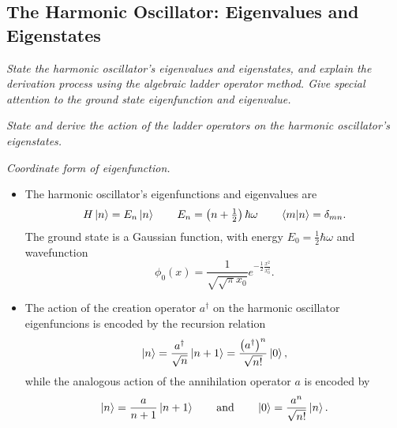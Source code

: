 \documentclass[11pt, a4paper]{article}
\newcommand{\eqtext}[1]{\qquad \text{#1} \qquad}
\begin{document}
\subsection{The Harmonic Oscillator: Eigenvalues and Eigenstates} \label{ss:qho-ladder}
\textit{State the harmonic oscillator's eigenvalues and eigenstates, and explain the derivation process using the algebraic ladder operator method. Give special attention to the ground state eigenfunction and eigenvalue.}

\vspace{2mm}
\textit{State and derive the action of the ladder operators on the harmonic oscillator's eigenstates.}

\vspace{2mm}
\textit{Coordinate form of eigenfunction.}

\begin{itemize}
    \item The harmonic oscillator's eigenfunctions and eigenvalues are
    \begin{equation*}
 		H\ket{n} = E_{n}\ket{n} \qquad E_{n} = \left(n + \tfrac{1}{2}\right)\hbar \omega \qquad \braket{m}{n} = \delta_{mn}.
    \end{equation*}
    The ground state is a Gaussian function, with energy $ E_{0} = \frac{1}{2}\hbar \omega $ and wavefunction
    \begin{equation*}
		\phi_{0}(x) = \frac{1}{\sqrt{\sqrt{\pi}x_{0}}}e^{-\frac{1}{2}\frac{x^{2}}{x_{0}^{2}}}.
    \end{equation*}

    \item The action of the creation operator $ a^{\dagger} $ on the harmonic oscillator eigenfuncions is encoded by the recursion relation
    \begin{equation*}
		\ket{n} = \frac{a^{\dagger}}{\sqrt{n}}\ket{n+1} = \frac{\big(a^{\dagger}\big)^{n}}{\sqrt{n!}}\ket{0},
    \end{equation*}
    while the analogous action of the annihilation operator $ a $ is encoded by
    \begin{equation*}
 		\ket{n} = \frac{a}{n+1}\ket{n+1} \eqtext{and} \ket{0} = \frac{a^{n}}{\sqrt{n!}}\ket{n}.
    \end{equation*}
    
    
\end{itemize}
\end{document}
